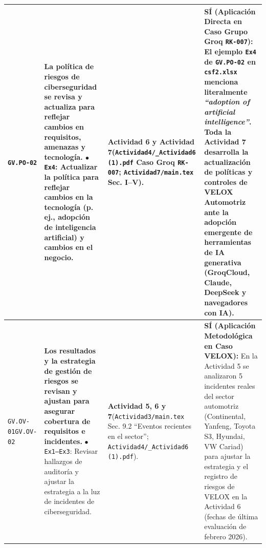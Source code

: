 \documentclass[letterpaper,11pt]{article}
\begin{document}
\begin{longtable}{|C{1.5cm}|L{5.3cm}|L{4.3cm}|L{5.8cm}|}
\texttt{GV.PO-02} &
\textbf{La política de riesgos de ciberseguridad se revisa y actualiza para reflejar cambios en requisitos, amenazas y tecnología.}\newline
$\bullet$ \texttt{Ex4}: Actualizar la política para reflejar cambios en la tecnología (p. ej., \textbf{adopción de inteligencia artificial}) y cambios en el negocio. &
\textbf{Actividad 6 y Actividad 7}\newline (\texttt{Actividad4/\_Actividad6 (1).pdf} Caso Groq \texttt{RK-007}; \texttt{Actividad7/main.tex} Sec. I--V). &
\textbf{SÍ (Aplicación Directa en Caso Grupo Groq \texttt{RK-007}):}\newline
El ejemplo \texttt{Ex4} de \texttt{GV.PO-02} en \texttt{csf2.xlsx} menciona literalmente \textit{``adoption of artificial intelligence''}. Toda la \textbf{Actividad 7} desarrolla la actualización de políticas y controles de VELOX Automotriz ante la adopción emergente de herramientas de IA generativa (GroqCloud, Claude, DeepSeek y navegadores con IA). \\
\hline

\texttt{GV.OV-01}\newline \texttt{GV.OV-02} &
\textbf{Los resultados y la estrategia de gestión de riesgos se revisan y ajustan para asegurar cobertura de requisitos e incidentes.}\newline
$\bullet$ \texttt{Ex1--Ex3}: Revisar hallazgos de auditoría y ajustar la estrategia a la luz de incidentes de ciberseguridad. &
\textbf{Actividad 5, 6 y 7}\newline (\texttt{Actividad3/main.tex} Sec. 9.2 ``Eventos recientes en el sector''; \texttt{Actividad4/\_Actividad6 (1).pdf}). &
\textbf{SÍ (Aplicación Metodológica en Caso VELOX):}\newline
En la Actividad 5 se analizaron 5 incidentes reales del sector automotriz (Continental, Yanfeng, Toyota S3, Hyundai, VW Cariad) para ajustar la estrategia y el registro de riesgos de VELOX en la Actividad 6 (fechas de última evaluación de febrero 2026). \\
\hline


\end{longtable}
\end{document}
